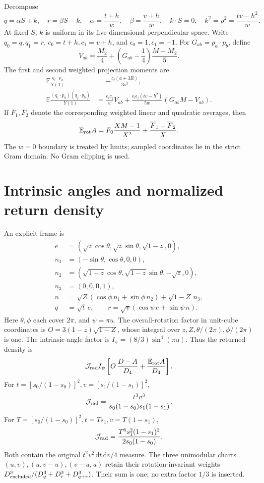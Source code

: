 \documentclass[11pt]{article}
\newcommand{\E}{\mathbb E}
\newcommand{\dd}{\,\mathrm d}
\begin{document}
Decompose
\[
 q=\alpha S+k,\quad r=\beta S-k,\quad
 \alpha=\frac{t+h}{w},\quad \beta=\frac{v+h}{w},\quad
 k\cdot S=0,\quad k^2=\rho^2=\frac{tv-h^2}{w}.
\]
At fixed \(S\), \(k\) is uniform in its five-dimensional perpendicular space.
Write \(q_0=q,q_1=r\), \(c_0=t+h,c_1=v+h\), and \(\epsilon_0=1,\epsilon_1=-1\).
For \(G_{ab}=p_a\cdot p_b\), define
\[
 V_{ab}=\frac{M_2}{4}+
       \left(G_{ab}-\frac14\right)\frac{M-M_2}{5}.
\]
The first and second weighted projection moments are
\begin{align*}
 \E\frac{q_i\cdot p_a}{Y(1)}
   &=-\frac{c_i(a+3R)}{3s^3},\\
 \E\frac{(q_i\cdot p_a)(q_j\cdot p_b)}{Y(1)}
   &=\frac{c_i c_j}{w}V_{ab}
    +\frac{\epsilon_i\epsilon_j(tv-h^2)}{5w}
       \left(G_{ab}M-V_{ab}\right).
\end{align*}
If \(\overline F_1,\overline F_2\) denote the corresponding weighted linear
and quadratic averages, then
\[
 \E_{\rm rot}A
 =F_0\frac{XM-1}{X^2}
  +\frac{\overline F_1+\overline F_2}{X}.
\]
The \(w=0\) boundary is treated by limits; sampled coordinates lie in the
strict Gram domain. No Gram clipping is used.

\section*{Intrinsic angles and normalized return density}
An explicit frame is
\begin{align*}
 e&=(\sqrt z\cos\theta,\sqrt z\sin\theta,\sqrt{1-z},0),\\
 n_1&=(-\sin\theta,\cos\theta,0,0),\\
 n_2&=(\sqrt{1-z}\cos\theta,\sqrt{1-z}\sin\theta,-\sqrt z,0),\\
 n_3&=(0,0,0,1),\\
 n&=\sqrt Z(\cos\phi\,n_1+\sin\phi\,n_2)+\sqrt{1-Z}\,n_3,\\
 q&=\sqrt t\,e,\qquad r=\sqrt v(\cos\psi\,e+\sin\psi\,n).
\end{align*}
Here \(\theta,\phi\) each cover \(2\pi\), and \(\psi=\pi u\).
The overall-rotation factor in unit-cube coordinates is
\(O=3(1-z)\sqrt{1-Z}\), whose integral over \(z,Z,\theta/(2\pi),\phi/(2\pi)\)
is one. The intrinsic-angle factor is \(I_\psi=(8/3)\sin^4(\pi u)\).
Thus the returned density is
\[
 {\cal J}_{\rm rad} I_\psi
 \left[ O\,\frac{D-A}{D_4}+\frac{\E_{\rm rot}A}{D_4}\right].
\]
For \(t=[s_0/(1-s_0)]^2,v=[s_1/(1-s_1)]^2\),
\[
 {\cal J}_{\rm rad}=\frac{t^3v^3}{s_0(1-s_0)s_1(1-s_1)}.
\]
For \(T=[s_0/(1-s_0)]^2,t=T s_1,v=T(1-s_1)\),
\[
 {\cal J}_{\rm rad}=\frac{T^6s_1^2(1-s_1)^2}{2s_0(1-s_0)}.
\]
Both contain the original \(t^2v^2\dd t\dd v/4\) measure.
The three unimodular charts \((u,v),(u,v-u),(v-u,u)\) retain their
rotation-invariant weights \(D_{\rm excluded}^3/
(D_q^3+D_r^3+D_{q+r}^3)\). Their sum is one; no extra factor \(1/3\) is inserted.
\end{document}
